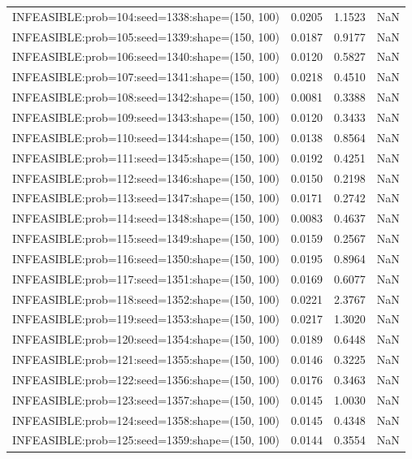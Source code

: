 \begin{longtable}{lccc}
INFEASIBLE:prob=104:seed=1338:shape=(150, 100) &   0.0205 &  1.1523 &    NaN \\
INFEASIBLE:prob=105:seed=1339:shape=(150, 100) &   0.0187 &  0.9177 &    NaN \\
INFEASIBLE:prob=106:seed=1340:shape=(150, 100) &   0.0120 &  0.5827 &    NaN \\
INFEASIBLE:prob=107:seed=1341:shape=(150, 100) &   0.0218 &  0.4510 &    NaN \\
INFEASIBLE:prob=108:seed=1342:shape=(150, 100) &   0.0081 &  0.3388 &    NaN \\
INFEASIBLE:prob=109:seed=1343:shape=(150, 100) &   0.0120 &  0.3433 &    NaN \\
INFEASIBLE:prob=110:seed=1344:shape=(150, 100) &   0.0138 &  0.8564 &    NaN \\
INFEASIBLE:prob=111:seed=1345:shape=(150, 100) &   0.0192 &  0.4251 &    NaN \\
INFEASIBLE:prob=112:seed=1346:shape=(150, 100) &   0.0150 &  0.2198 &    NaN \\
INFEASIBLE:prob=113:seed=1347:shape=(150, 100) &   0.0171 &  0.2742 &    NaN \\
INFEASIBLE:prob=114:seed=1348:shape=(150, 100) &   0.0083 &  0.4637 &    NaN \\
INFEASIBLE:prob=115:seed=1349:shape=(150, 100) &   0.0159 &  0.2567 &    NaN \\
INFEASIBLE:prob=116:seed=1350:shape=(150, 100) &   0.0195 &  0.8964 &    NaN \\
INFEASIBLE:prob=117:seed=1351:shape=(150, 100) &   0.0169 &  0.6077 &    NaN \\
INFEASIBLE:prob=118:seed=1352:shape=(150, 100) &   0.0221 &  2.3767 &    NaN \\
INFEASIBLE:prob=119:seed=1353:shape=(150, 100) &   0.0217 &  1.3020 &    NaN \\
INFEASIBLE:prob=120:seed=1354:shape=(150, 100) &   0.0189 &  0.6448 &    NaN \\
INFEASIBLE:prob=121:seed=1355:shape=(150, 100) &   0.0146 &  0.3225 &    NaN \\
INFEASIBLE:prob=122:seed=1356:shape=(150, 100) &   0.0176 &  0.3463 &    NaN \\
INFEASIBLE:prob=123:seed=1357:shape=(150, 100) &   0.0145 &  1.0030 &    NaN \\
INFEASIBLE:prob=124:seed=1358:shape=(150, 100) &   0.0145 &  0.4348 &    NaN \\
INFEASIBLE:prob=125:seed=1359:shape=(150, 100) &   0.0144 &  0.3554 &    NaN \\

\end{longtable}
